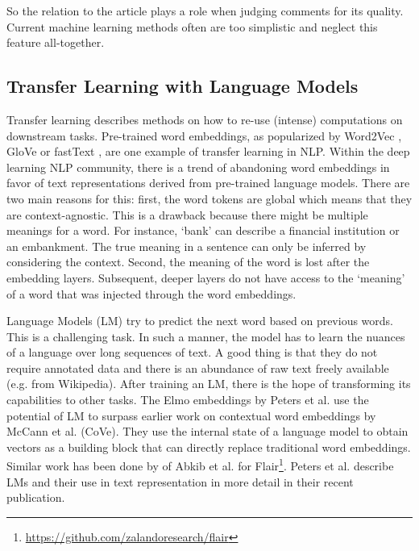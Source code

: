 So the relation to the article plays a role when judging comments for its quality. Current machine learning methods often are too simplistic and neglect this feature all-together.

\subsection{Transfer Learning with Language Models}

Transfer learning describes methods on how to re-use (intense) computations on downstream tasks. Pre-trained word embeddings, as popularized by Word2Vec \cite{DBLP:journals/corr/abs-1301-3781}, GloVe \cite{Pennington14glove:global} or fastText \cite{bojanowski2017enriching}, are one example of transfer learning in NLP. Within the deep learning NLP community, there is a trend of abandoning word embeddings in favor of text representations derived from pre-trained language models. There are two main reasons for this: first, the word tokens are global which means that they are context-agnostic. This is a drawback because there might be multiple meanings for a word. For instance, `bank' can describe a financial institution or an embankment. The true meaning in a sentence can only be inferred by considering the context. Second, the meaning of the word is lost after the embedding layers. Subsequent, deeper layers do not have access to the `meaning' of a word that was injected through the word embeddings.

Language Models (LM) try to predict the next word based on previous words. This is a challenging task. In such a manner, the model has to learn the nuances of a language over long sequences of text. A good thing is that they do not require annotated data and there is an abundance of raw text freely available (e.g. from Wikipedia). After training an LM, there is the hope of transforming its capabilities to other tasks. The Elmo embeddings by Peters et al. \cite{peters2018deep} use the potential of LM to surpass earlier work on contextual word embeddings by McCann et al. \cite{mccann2017learned} (CoVe). They use the internal state of a language model to obtain vectors as a building block that can directly replace traditional word embeddings. Similar work has been done by of Abkib et al. \cite{akbik_contextual_nodate} for Flair\footnote{\url{https://github.com/zalandoresearch/flair}}. Peters et al. \cite{peters_dissecting_2018} describe LMs and their use in text representation in more detail in their recent publication.

